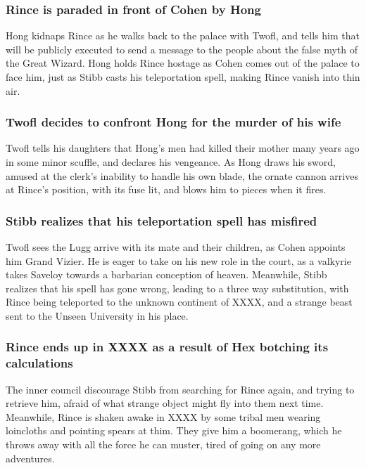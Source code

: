 \subsubsection{\Gls{Rince} is paraded in front of \Gls{Cohen} by \Gls{Hong}}
\Gls{Hong} kidnaps \Gls{Rince} as he walks back to the palace with \Gls{Twofl}, and tells him that
will be publicly executed to send a message to the people about the false myth of the Great Wizard.
\Gls{Hong} holds \Gls{Rince} hostage as \Gls{Cohen} comes out of the palace to face him, just as
\Gls{Stibb} casts his teleportation spell, making \Gls{Rince} vanish into thin air.

\subsubsection{\Gls{Twofl} decides to confront \Gls{Hong} for the murder of his wife}
\Gls{Twofl} tells his daughters that \Gls{Hong}'s men had killed their mother many years ago in some
minor scuffle, and declares his vengeance. As \Gls{Hong} draws his sword, amused at the clerk's
inability to handle his own blade, the ornate cannon arrives at \Gls{Rince}'s position, with its
fuse lit, and blows him to pieces when it fires.

\subsubsection{\Gls{Stibb} realizes that his teleportation spell has misfired}
\Gls{Twofl} sees the \Gls{Lugg} arrive with its mate and their children, as \Gls{Cohen} appoints him
Grand Vizier. He is eager to take on his new role in the court, as a valkyrie takes \Gls{Saveloy}
towards a barbarian conception of heaven. Meanwhile, \Gls{Stibb} realizes that his spell has gone
wrong, leading to a three way substitution, with \Gls{Rince} being teleported to the unknown
continent of XXXX, and a strange beast sent to the Unseen University in his place.

\subsubsection{\Gls{Rince} ends up in XXXX as a result of \Gls{Hex} botching its calculations}
The inner council discourage \Gls{Stibb} from searching for \Gls{Rince} again, and trying to
retrieve him, afraid of what strange object might fly into them next time. Meanwhile, \Gls{Rince}
is shaken awake in XXXX by some tribal men wearing loincloths and pointing spears at thim. They
give him a boomerang, which he throws away with all the force he can muster, tired of going on any
more adventures.


